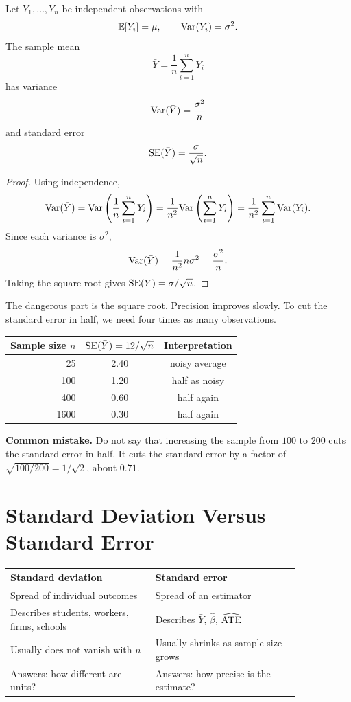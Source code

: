 \begin{thmN}
Let $Y_1,\ldots,Y_n$ be independent observations with
\[
  \mathbb{E}[Y_i]=\mu,
  \qquad
  \mathrm{Var}(Y_i)=\sigma^2.
\]
The sample mean
\[
  \bar{Y} = \frac{1}{n}\sum_{i=1}^n Y_i
\]
has variance
\[
  \mathrm{Var}(\bar{Y}) = \frac{\sigma^2}{n}
\]
and standard error
\[
  \mathrm{SE}(\bar{Y}) = \frac{\sigma}{\sqrt{n}}.
\]
\end{thmN}

\begin{proof}
Using independence,
\[
  \mathrm{Var}(\bar{Y})
  =
  \mathrm{Var}\left(\frac{1}{n}\sum_{i=1}^n Y_i\right)
  =
  \frac{1}{n^2}\mathrm{Var}\left(\sum_{i=1}^n Y_i\right)
  =
  \frac{1}{n^2}\sum_{i=1}^n \mathrm{Var}(Y_i).
\]
Since each variance is $\sigma^2$,
\[
  \mathrm{Var}(\bar{Y})
  =
  \frac{1}{n^2}n\sigma^2
  =
  \frac{\sigma^2}{n}.
\]
Taking the square root gives $\mathrm{SE}(\bar{Y})=\sigma/\sqrt{n}$.
\end{proof}

The dangerous part is the square root. Precision improves slowly. To cut the
standard error in half, we need four times as many observations.

\begin{center}
\begin{tabular}{rcc}
\toprule
Sample size $n$ & $\mathrm{SE}(\bar{Y})=12/\sqrt{n}$ & Interpretation \\
\midrule
25 & 2.40 & noisy average \\
100 & 1.20 & half as noisy \\
400 & 0.60 & half again \\
1600 & 0.30 & half again \\
\bottomrule
\end{tabular}
\end{center}

\begin{boxF}
\textbf{Common mistake.} Do not say that increasing the sample from $100$ to
$200$ cuts the standard error in half. It cuts the standard error by a factor
of $\sqrt{100/200}=1/\sqrt{2}$, about $0.71$.
\end{boxF}

\section{Standard Deviation Versus Standard Error}

\begin{center}
\begin{tabular}{p{0.42\linewidth}p{0.42\linewidth}}
\toprule
Standard deviation & Standard error \\
\midrule
Spread of individual outcomes & Spread of an estimator \\
Describes students, workers, firms, schools & Describes $\bar{Y}$, $\hat{\beta}$, $\widehat{\mathrm{ATE}}$ \\
Usually does not vanish with $n$ & Usually shrinks as sample size grows \\
Answers: how different are units? & Answers: how precise is the estimate? \\
\bottomrule
\end{tabular}
\end{center}

